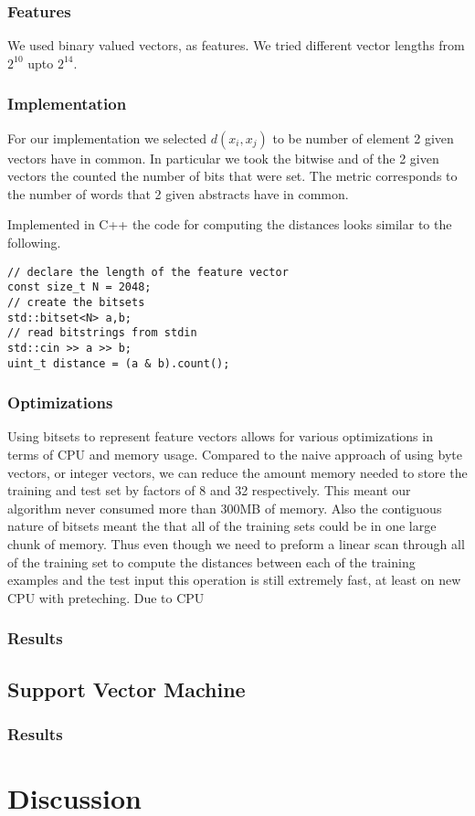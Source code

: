 \documentclass[10pt,twocolumn]{article}
\begin{document}
\subsubsection{Features}
We used binary valued vectors, as features. We tried different vector lengths from $2^{10}$ upto $2^{14}$.
\subsubsection{Implementation}
For our implementation we selected $d(x_i,x_j)$ to be number of element 2 given vectors have in common. In particular we took the bitwise and of the 2 given vectors the counted the number of bits that were set. The metric corresponds to the number of words that 2 given abstracts have in common. 

Implemented in C++ the code for computing the distances looks similar to the following.

\begin{lstlisting}
// declare the length of the feature vector
const size_t N = 2048;
// create the bitsets
std::bitset<N> a,b;
// read bitstrings from stdin
std::cin >> a >> b; 
uint_t distance = (a & b).count();
\end{lstlisting}
\subsubsection{Optimizations}
Using bitsets to represent feature vectors allows for various optimizations in terms of CPU and memory usage. Compared to the naive approach of using byte vectors, or integer vectors, we can reduce the amount memory needed to store the training and test set by factors of 8 and 32 respectively. This meant our algorithm never consumed more than 300MB of memory. Also the contiguous nature of bitsets meant the that all of the training sets could be in one large chunk of memory. Thus even though we need to preform a linear scan through all of the training set to compute the distances between each of the training examples and the test input this operation is still extremely fast, at least on new CPU with preteching. Due to CPU 
\subsubsection{Results}
\subsection{Support Vector Machine}
\subsubsection{Results}
\section{Discussion}
\end{document}
